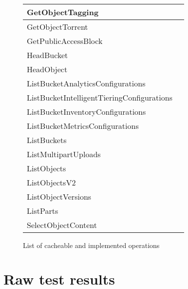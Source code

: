 \begin{figure}[h!]
\begin{center}
\begin{tabular}{| l | l |}
			GetObjectTagging & \xmark \\ \hline
			GetObjectTorrent & \xmark \\ \hline
			GetPublicAccessBlock & \xmark \\ \hline
			HeadBucket & \cmark \\ \hline
			HeadObject & \cmark \\ \hline
			ListBucketAnalyticsConfigurations & \xmark \\ \hline
			ListBucketIntelligentTieringConfigurations & \xmark \\ \hline
			ListBucketInventoryConfigurations & \xmark \\ \hline
			ListBucketMetricsConfigurations & \xmark \\ \hline
			ListBuckets & \cmark \\ \hline
			ListMultipartUploads & \xmark \\ \hline
			ListObjects & \cmark \\ \hline
			ListObjectsV2 & \cmark \\ \hline
			ListObjectVersions & \cmark \\ \hline
			ListParts & \xmark \\ \hline
			SelectObjectContent & \xmark \\ \hline
		\end{tabular}
	\end{center}
	\caption{List of cacheable and implemented operations}
	\label{appendix:tab:cachedops}
\end{figure}

\pagebreak

\section{Raw test results}
\label{rawresults}

